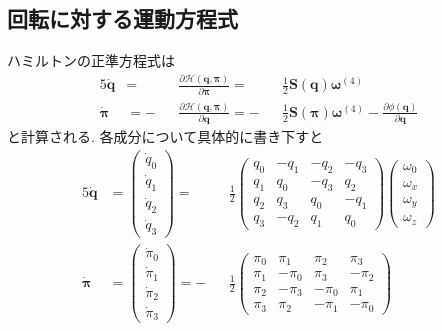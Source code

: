 \subsection{回転に対する運動方程式}
ハミルトンの正準方程式は
\begin{alignat}{5}
  \dot{\bm{q}}
  &= &&
  \frac{\partial \mathcal{H}(\bm{q}, \bm{\pi})}{\partial \bm{\pi}}
  = &&
  \frac{1}{2}
  \bm{S}(\bm{q}) \bm{\omega}^{(4)}
  \\
  \dot{\bm{\pi}}
  &= -&&
  \frac{\partial \mathcal{H}(\bm{q}, \bm{\pi})}{\partial \bm{q}}
  = -&&
  \frac{1}{2}
  \bm{S}(\bm{\pi}) \bm{\omega}^{(4)}
  -
  \frac{\partial \phi(\bm{q})}{\partial \bm{q}}
\end{alignat}
と計算される. 各成分について具体的に書き下すと
\begin{alignat}{5}
  \dot{\bm{q}} &=
  \begin{pmatrix}
    \dot{q}_{0} \\ \dot{q}_{1} \\ \dot{q}_{2} \\ \dot{q}_{3}
  \end{pmatrix}
  = &&
  \frac{1}{2}
  \begin{pmatrix}
    q_{0} & -q_{1} & -q_{2} & -q_{3} \\
    q_{1} &  q_{0} & -q_{3} &  q_{2} \\
    q_{2} &  q_{3} &  q_{0} & -q_{1} \\
    q_{3} & -q_{2} &  q_{1} &  q_{0}
  \end{pmatrix}
  \begin{pmatrix}
    \omega_{0} \\ \omega_{x} \\ \omega_{y} \\ \omega_{z}
  \end{pmatrix}
  \\
  \dot{\bm{\pi}} &=
  \begin{pmatrix}
    \dot{\pi}_{0} \\ \dot{\pi}_{1} \\ \dot{\pi}_{2} \\ \dot{\pi}_{3}
  \end{pmatrix}
  = -&&
  \frac{1}{2}
  \begin{pmatrix}
    \pi_{0} &  \pi_{1} &  \pi_{2} &  \pi_{3} \\
    \pi_{1} & -\pi_{0} &  \pi_{3} & -\pi_{2} \\
    \pi_{2} & -\pi_{3} & -\pi_{0} &  \pi_{1} \\
    \pi_{3} &  \pi_{2} & -\pi_{1} & -\pi_{0}

\end{pmatrix}
\end{alignat}
